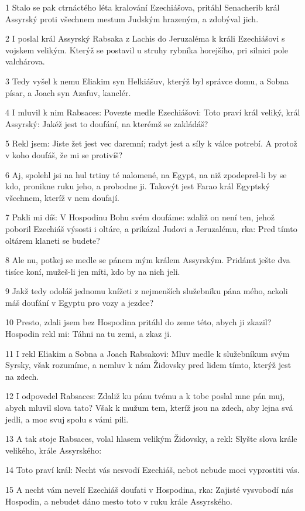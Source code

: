 \par 1 Stalo se pak ctrnáctého léta kralování Ezechiášova, pritáhl Senacherib král Assyrský proti všechnem mestum Judským hrazeným, a zdobýval jich.
\par 2 I poslal král Assyrský Rabsaka z Lachis do Jeruzaléma k králi Ezechiášovi s vojskem velikým. Kterýž se postavil u struhy rybníka horejšího, pri silnici pole valchárova.
\par 3 Tedy vyšel k nemu Eliakim syn Helkiášuv, kterýž byl správce domu, a Sobna písar, a Joach syn Azafuv, kanclér.
\par 4 I mluvil k nim Rabsaces: Povezte medle Ezechiášovi: Toto praví král veliký, král Assyrský: Jakéž jest to doufání, na kterémž se zakládáš?
\par 5 Rekl jsem: Jiste žet jest vec daremní; radyt jest a síly k válce potrebí. A protož v koho doufáš, že mi se protivíš?
\par 6 Aj, spolehl jsi na hul trtiny té nalomené, na Egypt, na niž zpodeprel-li by se kdo, pronikne ruku jeho, a probodne ji. Takovýt jest Farao král Egyptský všechnem, kteríž v nem doufají.
\par 7 Pakli mi díš: V Hospodinu Bohu svém doufáme: zdaliž on není ten, jehož poboril Ezechiáš výsosti i oltáre, a prikázal Judovi a Jeruzalému, rka: Pred tímto oltárem klaneti se budete?
\par 8 Ale nu, potkej se medle se pánem mým králem Assyrským. Pridámt ješte dva tisíce koní, mužeš-li jen míti, kdo by na nich jeli.
\par 9 Jakž tedy odoláš jednomu knížeti z nejmenších služebníku pána mého, ackoli máš doufání v Egyptu pro vozy a jezdce?
\par 10 Presto, zdali jsem bez Hospodina pritáhl do zeme této, abych ji zkazil? Hospodin rekl mi: Táhni na tu zemi, a zkaz ji.
\par 11 I rekl Eliakim a Sobna a Joach Rabsakovi: Mluv medle k služebníkum svým Syrsky, však rozumíme, a nemluv k nám Židovsky pred lidem tímto, kterýž jest na zdech.
\par 12 I odpovedel Rabsaces: Zdaliž ku pánu tvému a k tobe poslal mne pán muj, abych mluvil slova tato? Však k mužum tem, kteríž jsou na zdech, aby lejna svá jedli, a moc svuj spolu s vámi pili.
\par 13 A tak stoje Rabsaces, volal hlasem velikým Židovsky, a rekl: Slyšte slova krále velikého, krále Assyrského:
\par 14 Toto praví král: Necht vás nesvodí Ezechiáš, nebot nebude moci vyprostiti vás.
\par 15 A necht vám nevelí Ezechiáš doufati v Hospodina, rka: Zajisté vysvobodí nás Hospodin, a nebudet dáno mesto toto v ruku krále Assyrského.
